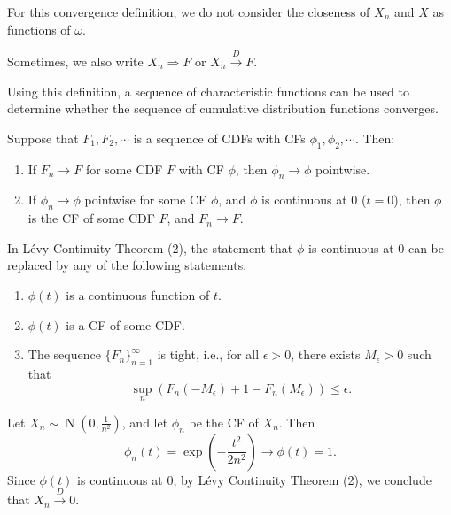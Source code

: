 \documentclass{huhtakm-template-book-v2}
\DeclareMathOperator{\N}{N}
\begin{document}
    \begin{rem}
        For this convergence definition, we do not consider the closeness of $X_{n}$ and $X$ as functions of $\omega$.
    \end{rem}
    \begin{rem}
        Sometimes, we also write $X_{n}\Rightarrow F$ or $X_{n} \xrightarrow{D} F$.
    \end{rem}
    Using this definition, a sequence of characteristic functions can be used to determine whether the sequence of cumulative distribution functions converges.
    \begin{thm}
        Suppose that $F_{1},F_{2},\cdots$ is a sequence of CDFs with CFs $\phi_{1},\phi_{2},\cdots$. Then:
        \begin{enumerate}
            \item If $F_{n} \to F$ for some CDF $F$ with CF $\phi$, then $\phi_{n} \to \phi$ pointwise.
            \item If $\phi_{n} \to \phi$ pointwise for some CF $\phi$, and $\phi$ is continuous at $0$ ($t = 0$), then $\phi$ is the CF of some CDF $F$, and $F_{n} \to F$.
        \end{enumerate}
    \end{thm}
    \begin{rem}
        In L\'evy Continuity Theorem (2), the statement that $\phi$ is continuous at $0$ can be replaced by any of the following statements:
        \begin{enumerate}
            \item $\phi(t)$ is a continuous function of $t$.
            \item $\phi(t)$ is a CF of some CDF.
            \item The sequence $\{F_{n}\}_{n = 1}^{\infty}$ is tight, i.e., for all $\epsilon > 0$, there exists $M_{\epsilon} > 0$ such that
            \begin{equation*}
                \sup_{n}(F_{n}(-M_{\epsilon})+1-F_{n}(M_{\epsilon})) \leq \epsilon.
            \end{equation*}
        \end{enumerate}
    \end{rem}
    \begin{eg}
        Let $X_{n} \sim \N(0,\frac{1}{n^{2}})$, and let $\phi_{n}$ be the CF of $X_{n}$. Then
        \begin{equation*}
            \phi_{n}(t) = \exp\left(-\frac{t^{2}}{2n^{2}}\right) \to \phi(t) = 1.
        \end{equation*}
        Since $\phi(t)$ is continuous at $0$, by L\'evy Continuity Theorem (2), we conclude that $X_{n} \xrightarrow{D} 0$.
    \end{eg}
    \newpage
\end{document}
